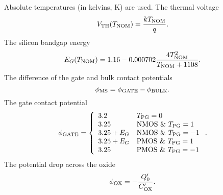 \noindent
Absolute temperatures (in kelvins, K) are used.
The thermal voltage
\begin{equation}
V_{\mbox{\scriptsize TH}}(T_{\mbox{\scriptsize NOM}}) = {{kT_{\mbox{\scriptsize NOM}}} \over q} .
\end{equation}
\noindent The silicon bandgap energy
\begin{equation}
E_G(T_{\mbox{\scriptsize NOM}})=1.16 - 0.000702{{4T_{\mbox{\scriptsize NOM}}^2} \over {T_{\mbox{\scriptsize NOM}}+1108}} .
\end{equation}
The difference of the gate and bulk contact potentials
\begin{equation}
\phi_{\mbox{\scriptsize MS}} = \phi_{\mbox{\scriptsize GATE}} - \phi_{\mbox{\scriptsize BULK}} .
\end{equation}
The gate contact potential
\begin{equation}
\phi_{\mbox{\scriptsize GATE}} = \left\{ \begin{array}{ll}
        3.2 & \mbox{$T_{\mbox{\scriptsize PG}} = 0$}\\
        3.25& \mbox{NMOS \& $T_{\mbox{\scriptsize PG}} = 1$}\\
        3.25 + E_G     & \mbox{NMOS \& $T_{\mbox{\scriptsize PG}} = -1$}\\
        3.25 + E_G     & \mbox{PMOS \& $T_{\mbox{\scriptsize PG}} = 1$} \\
        3.25& \mbox{PMOS \& $T_{\mbox{\scriptsize PG}} = -1$}
        \end{array} \right. .
\end{equation}
The potential drop across the oxide
\begin{equation}
\phi_{\mbox{\scriptsize OX}} = - {{\textstyle Q'_0 } \over { C'_{\mbox{\scriptsize OX}}}} .
\end{equation}

